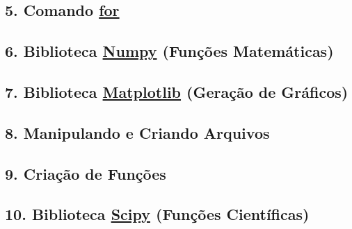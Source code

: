 \documentclass[a4paper]{book}
\begin{document}
		\subsection*{5. Comando \Large \underline{for}}
		
		\subsection*{6. Biblioteca \underline{Numpy} (Funções Matemáticas)}
		
		\subsection*{7. Biblioteca \underline{Matplotlib} (Geração de Gráficos)}
		
		\subsection*{8. Manipulando e Criando Arquivos}
		
		\subsection*{9. Criação de Funções}
		
		\subsection*{10. Biblioteca \underline{Scipy} (Funções Científicas)}
\end{document}
